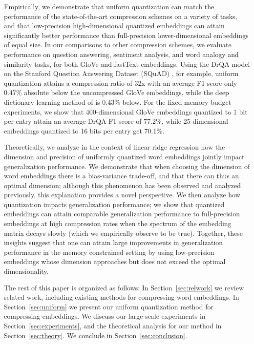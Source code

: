 Empirically, we demonstrate that uniform quantization can match the performance of the state-of-the-art compression schemes on a variety of tasks, and that low-precision high-dimensional quantized embeddings can attain significantly better performance than full-precision lower-dimensional embeddings of equal size.
In our comparisons to other compression schemes, we evaluate performance on question answering, sentiment analysis, and word analogy and similarity tasks, for both GloVe \citep{glove14} and fastText \citep{fasttext18} embeddings.
Using the DrQA model \citep{drqa17} on the Stanford Question Answering Dataset (SQuAD) \citep{squad16}, for example, uniform quantization attains a compression ratio of 32x with an average F1 score only 0.47\% absolute below the uncompressed GloVe embeddings, while the deep dictionary learning method of \citet{dccl17} is 0.43\% below.
For the fixed memory budget experiments, we show that 400-dimensional GloVe embeddings quantized to 1 bit per entry attain an average DrQA F1 score of 77.2\%, while 25-dimensional embeddings quantized to 16 bits per entry get 70.1\%.

Theoretically, we analyze in the context of linear ridge regression how the dimension and precision of uniformly quantized word embeddings jointly impact generalization performance.
We demonstrate that when choosing the dimension of word embeddings there is a bias-variance trade-off, and that there can thus an optimal dimension; although this phenomenon has been observed \citep{landauer97} and analyzed \citep{yin18} previously, this explanation provides a novel perspective.
We then analyze how quantization impacts generalization performance; we show that quantized embeddings can attain comparable generalization performance to full-precision embeddings at high compression rates when the spectrum of the embedding matrix decays slowly (which we empirically observe to be true).
Together, these insights suggest that one can attain large improvements in generalization performance in the memory constrained setting by using low-precision embeddings whose dimension approaches but does not exceed the optimal dimensionality.

The rest of this paper is organized as follows:
In Section~\ref{sec:relwork} we review related work, including existing methods for compressing word embeddings.
In Section~\ref{sec:uniform} we present our uniform quantization method for compressing embeddings.
We discuss our large-scale experiments in Section~\ref{sec:experiments}, and the theoretical analysis for our method in Section~\ref{sec:theory}.
We conclude in Section~\ref{sec:conclusion}.


